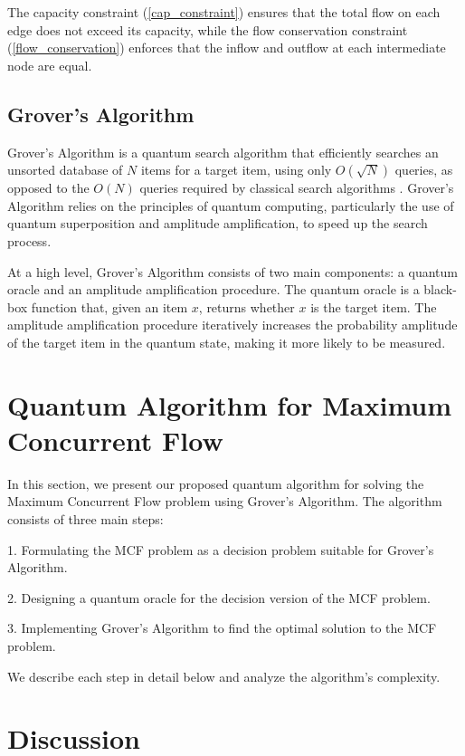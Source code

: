 The capacity constraint (\ref{cap_constraint}) ensures that the total flow on each edge does not exceed its capacity, while the flow conservation constraint (\ref{flow_conservation}) enforces that the inflow and outflow at each intermediate node are equal.

\subsection{Grover's Algorithm}

Grover's Algorithm is a quantum search algorithm that efficiently searches an unsorted database of $N$ items for a target item, using only $O(\sqrt{N})$ queries, as opposed to the $O(N)$ queries required by classical search algorithms \cite{grover1996fast}. Grover's Algorithm relies on the principles of quantum computing, particularly the use of quantum superposition and amplitude amplification, to speed up the search process.

At a high level, Grover's Algorithm consists of two main components: a quantum oracle and an amplitude amplification procedure. The quantum oracle is a black-box function that, given an item $x$, returns whether $x$ is the target item. The amplitude amplification procedure iteratively increases the probability amplitude of the target item in the quantum state, making it more likely to be measured.

\section{Quantum Algorithm for Maximum Concurrent Flow} \label{algorithm}

In this section, we present our proposed quantum algorithm for solving the Maximum Concurrent Flow problem using Grover's Algorithm. The algorithm consists of three main steps:

1. Formulating the MCF problem as a decision problem suitable for Grover's Algorithm.

2. Designing a quantum oracle for the decision version of the MCF problem.

3. Implementing Grover's Algorithm to find the optimal solution to the MCF problem.

We describe each step in detail below and analyze the algorithm's complexity.


\section{Discussion} \label{discussion}

